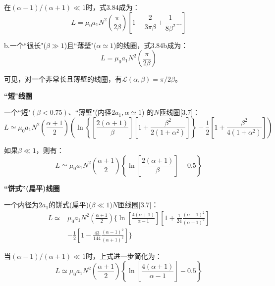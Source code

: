 在$(\alpha−1)/(\alpha+1)\ll 1$时，式3.84成为：
\begin{equation*}
  L=\mu_0a_1N^2\left(\frac{\pi}{2\beta}\right)\left[1-\frac{2}{3\pi\beta}+\frac{1}{8\beta^2}...\right] \tag{3.84b}%
\end{equation*}

b.一个``很长"($\beta\gg 1$)且``薄壁"($\alpha \simeq 1$)的线圈，式3.84b成为：
\begin{equation*}
  L=\mu_0a_1N^2\left(\frac{\pi}{2\beta}\right) \tag{3.84c}%
\end{equation*}

可见，对一个非常长且薄壁的线圈，有$\mathcal{L}(\alpha,\beta)=\pi/2\beta$。

\textbf{``短"线圈}

 一个``短"$(\beta<0.75)$、``薄壁"(内径$2a_1,\alpha\simeq 1$) 的$N$匝线圈[3.7]：
\begin{equation}
L\simeq \mu_0a_1N^2\left(\frac{\alpha+1}{2}\right)\left(\ln\left\{\left[\frac{2(\alpha+1)}{\beta}\right]\left[1+\frac{\beta^2}{2(1+\alpha^2)}\right]\right\}-\frac{1}{2}\left[1+\frac{\beta^2}{4(1+\alpha^2)}\right]\right)
\end{equation}
  
  如果$\beta \ll 1$，则有：
  \begin{equation*}
L\simeq\mu_0a_1N^2\left(\frac{\alpha+1}{2}\right)\left\{\ln\left[\frac{2(\alpha+1)}{\beta}\right]-0.5\right\} \tag{3.85b}%
\end{equation*}

\textbf{``饼式''(扁平)线圈}

一个内径为$2a_1$的饼式(扁平)($\beta\ll 1$)$N$匝线圈[3.7]：
  \begin{equation}
  \begin{split}
L\simeq & \mu_0a_1N^2\left(\frac{\alpha+1}{2}\right)\bigg\{\ln\left[\frac{4(\alpha+1)}{\alpha-1}\right]\left[1+\frac{1}{24}\frac{(\alpha-1)^2}{(\alpha+1)^2}\right]\\
&-\frac{1}{2}\left[1-\frac{43}{144}\frac{(\alpha-1)^2}{(\alpha+1)^2}\right]\bigg\}%
  \end{split}
\end{equation}

当$(\alpha-1)/(\alpha+1)\ll 1$时，上式进一步简化为：
\begin{equation*}
L\simeq\mu_0a_1N^2\left(\frac{\alpha+1}{2}\right)\left\{\ln\left[\frac{4(\alpha+1)}{\alpha-1}\right]-0.5\right\} \tag{3.86b}%
\end{equation*}


